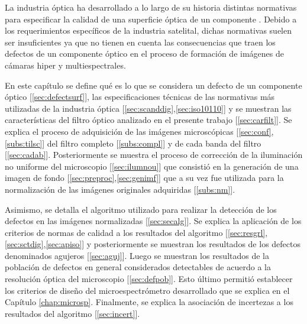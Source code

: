 

\singlespacing
{}
\label{chap:zeiss}

\hspace{0.5cm}La industria óptica ha desarrollado a lo largo de su historia distintas normativas para especificar la calidad de una superficie óptica de un componente \cite{cosm}. Debido a los requerimientos específicos de la industria satelital, dichas normativas suelen ser insuficientes ya que no tienen en cuenta las consecuencias que traen los defectos de un componente óptico en el proceso de formación de imágenes de cámaras hiper y multiespectrales.

En este capítulo se define qué es lo que se considera un defecto de un componente óptico [\ref{sec:defectsurf}], las especificaciones técnicas de las normativas más utilizadas de la industria óptica [\ref{sec:scanddig},\ref{sec:iso10110}] y se muestran las características del filtro óptico analizado en el presente trabajo [\ref{sec:carfilt}]. Se explica el proceso de adquisición de las imágenes microscópicas [\ref{sec:conf},\ref{subs:tilsc}] del filtro completo [\ref{subs:compl}] y de cada banda del filtro [\ref{sec:cadab}]. Posteriormente se muestra el proceso de corrección de la iluminación no uniforme del microscopio [\ref{sec:ilumnou}]  que consistió en la generación de una imagen de fondo [\ref{sec:preproc},\ref{sec:genimf}] que a su vez fue utilizada para la normalización de las imágenes originales adquiridas [\ref{subs:nm}].

Asimismo, se detalla el algoritmo utilizado para realizar la detección de los defectos en las imágenes normalizadas [\ref{sec:secalg}]. Se explica la aplicación de los criterios de normas de calidad a los resultados del algoritmo [\ref{sec:resgrl},\ref{sec:sctdig},\ref{sec:apiso}] y posteriormente se muestran los resultados de los defectos denominados agujeros [\ref{sec:aguj}]. Luego se muestran los resultados de la población de defectos en general considerados detectables de acuerdo a la resolución óptica del microscopio [\ref{sec:defpob}]. Esto último permitió establecer los criterios de diseño del microespectrómetro desarrollado que se explica en el Capítulo \ref{chap:microsp}. Finalmente, se explica la asociación de incertezas a los resultados del algoritmo [\ref{sec:incert}].

